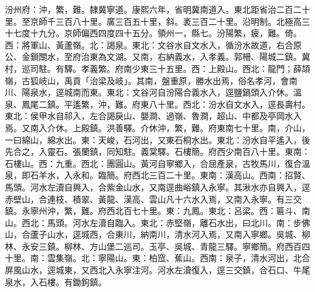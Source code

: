 \begin{pinyinscope}
汾州府：沖，繁，難。隸冀寧道。康熙六年，省明冀南道入。東北距省治二百二十里。至京師千三百八十里。廣三百五十里，斜。袤三百二十里。沿明制。北極高三十七度十九分。京師偏西四度四十五分。領州一，縣七。汾陽繁，疲，難。倚。西：將軍山、黃蘆嶺。北：謁泉。東北：文谷水自文水入，循汾水故道，右合原公、金鎖關水，至府治東為文湖。又南，右納義水，入孝義。郭柵、陽城二鎮。冀村，巡司駐。有驛。孝義繁。府南少東三十五里。西：上殿山。西北：龍門；薛頡嶺，古狐岐山，禹貢「治梁及岐」。其南，盤重原，勝水出焉，俗名孝河，會南川、陽泉水，逕城南而東。東北：文谷河自汾陽合義水入，逕鹽鍋頭入介休。溫泉、鳳尾二鎮。平遙繁，沖，難。府東八十里。西北：汾水自文水入，逕長壽村。東北：侯甲水自祁入，左合謁戾山、嬰澗、過嶺、魯澗，超山、中都及亭岡水入焉。又南入介休。上殿鎮。洪善驛。介休沖，繁，難。府東南七十里。南，介山，一曰綿山，綿水出。東：天峻，石河出，又東石桐水出。東北：汾水自平遙入，後先合之，入靈石。張蘭鎮，同知駐。義棠驛。石樓簡。府西少南百八十里。東南：石樓山。西：九重。西北：團圓山。黃河自寧鄉入，合屈產泉，古牧馬川，復合溫泉，即石羊水，入永和。臨簡。府西北三百二十里。東南：漢高山。西南：招賢、馬頭。河水左瀆自興入，合紫金山水，又南逕曲峪鎮入永寧。其湫水亦自興入，逕赤壁山，合連枝、積翠、黃龍、漢高、雲山凡十六水入焉，又南入永寧。有三交鎮。永寧州沖，繁，難。府西北百七十里。東：九鳳。東北：呂梁。西：匾斗、南山。西北：馬頭。河水左瀆自臨入。東北：赤堅嶺，離石水出，曰北川。南：步佛山，合蘆子山水，逕城西，合東川，納南川，清水河入焉，又南入寧鄉。吳城、柳林、永安三鎮。柳林、方山堡二巡司。玉亭、吳城、青龍三驛。寧鄉簡。府西百四十里。南：雲集嶺。北：寧陽山。東：柏窊、蕉山。西南：泉子，清水河出，北合屏風山水，逕城東，又西北入永寧注河。河水左瀆復入，逕三交鎮，合石口、牛尾泉水，入石樓。有鋤鉤鎮。


\end{pinyinscope}
